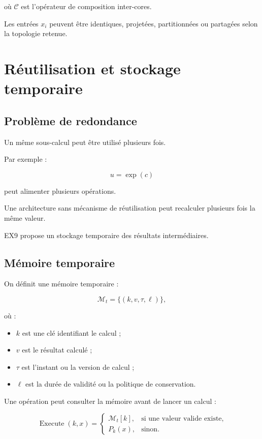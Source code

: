 \documentclass[11pt,a4paper]{article}
\begin{document}
où $\mathcal{C}$ est l'opérateur de composition inter-cores.

Les entrées $x_i$ peuvent être identiques, projetées, partitionnées
ou partagées selon la topologie retenue.

\section{Réutilisation et stockage temporaire}

\subsection{Problème de redondance}

Un même sous-calcul peut être utilisé plusieurs fois.

Par exemple :

\[
u=\exp(c)
\]

peut alimenter plusieurs opérations.

Une architecture sans mécanisme de réutilisation peut recalculer
plusieurs fois la même valeur.

EX9 propose un stockage temporaire des résultats intermédiaires.

\subsection{Mémoire temporaire}

On définit une mémoire temporaire :

\[
\mathcal{M}_t
=
\{(k,v,\tau,\ell)\},
\]

où :
\begin{itemize}
  \item $k$ est une clé identifiant le calcul ;
  \item $v$ est le résultat calculé ;
  \item $\tau$ est l'instant ou la version de calcul ;
  \item $\ell$ est la durée de validité ou la politique de conservation.
\end{itemize}

Une opération peut consulter la mémoire avant de lancer un calcul :

\[
\operatorname{Execute}(k,x)
=
\begin{cases}
\mathcal{M}_t[k],
& \text{si une valeur valide existe},\\
P_k(x),
& \text{sinon}.
\end{cases}
\]
\end{document}
